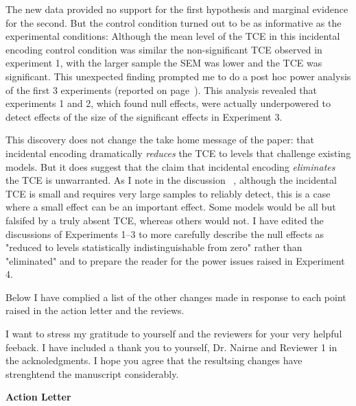 \documentclass[12pt]{article}
\begin{document}
The new data provided no support for the first hypothesis and marginal evidence for the second. But the control condition turned out to be as informative as the experimental conditions: Although the mean level of the TCE in this incidental encoding control condition was similar the non-significant TCE observed in experiment 1, with the larger sample the SEM was lower and the TCE was significant. This unexpected finding prompted me to do a post hoc power analysis of the first 3 experiments (reported on page~\pageref{power}). This analysis revealed that experiments 1 and 2, which found null effects, were actually underpowered to detect effects of the size of the significant effects in Experiment 3. 

This discovery does not change the take home message of the paper: that incidental encoding dramatically \emph{reduces} the TCE to levels that challenge existing models. But it does suggest that the claim that incidental encoding \emph{eliminates} the TCE is unwarranted. As I note in the discussion ~\pageref{zerovsnear}, although the incidental TCE is small and requires very large samples to reliably detect, this is a case where a small effect can be an important effect. Some models would be all but falsifed by a truly absent TCE, whereas others would not. I have edited the discussions of Experiments 1--3 to more carefully describe the null effects as "reduced to levels statistically indistinguishable from zero" rather than "eliminated" and to prepare the reader for the power issues raised in Experiment 4.

Below I have complied a list of the other changes made in response to each point raised in the action letter and the reviews. 

I want to stress my gratitude to yourself and the reviewers for your very helpful feeback. I have included a thank you to yourself, Dr. Nairne and Reviewer 1 in the acknoledgments. I hope you agree that the resultsing changes have strenghtend the manuscript considerably.

\vspace{20pt}

\textbf{\large{Action Letter}}
\end{document}
